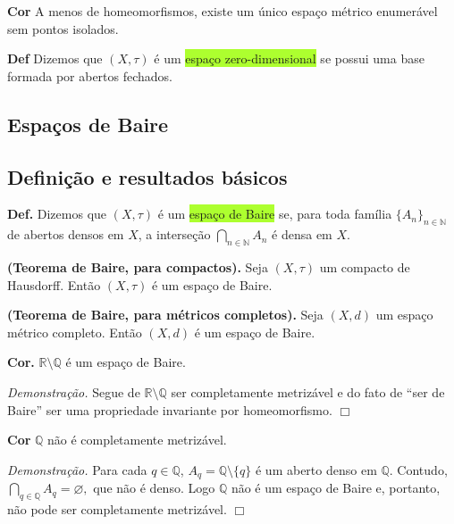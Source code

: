 \documentclass{article}
\begin{document}
\begin{landscape}
\begin{multicols}{3}
\medskip

\textbf{Cor} A menos de homeomorfismos, existe um único espaço métrico enumerável sem pontos isolados.

\medskip

\textbf{Def} Dizemos que \((X,\tau)\) é um \colorbox{GreenYellow}{espaço zero-dimensional} se possui uma base formada por abertos fechados.

\medskip
\end{multicols}
\begin{center}
    
\section{Espaços de Baire}
\end{center}
\begin{multicols}{3}
    
\subsection{Definição e resultados básicos}
\textbf{Def.} Dizemos que \((X,\tau)\) é um \colorbox{GreenYellow}{espaço de Baire} se, para toda família \(\{A_n\}_{n\in\mathbb{N}}\) de abertos densos em \(X\), a interseção
$
\bigcap_{n\in\mathbb{N}}A_n
$
é densa em \(X\).

\medskip

\textbf{(Teorema de Baire, para compactos).} Seja \((X,\tau)\) um compacto de Hausdorff. Então \((X,\tau)\) é um espaço de Baire.

\medskip

\textbf{(Teorema de Baire, para métricos completos).} Seja \((X,d)\) um espaço métrico completo. Então \((X,d)\) é um espaço de Baire.

\medskip

\textbf{Cor.} \(\mathbb{R}\setminus\mathbb{Q}\) é um espaço de Baire.  

\emph{Demonstração.} Segue de \(\mathbb{R}\setminus\mathbb{Q}\) ser completamente metrizável e do fato de “ser de Baire” ser uma propriedade invariante por homeomorfismo. \(\Box\)

\medskip

\textbf{Cor} \(\mathbb{Q}\) não é completamente metrizável.  

\emph{Demonstração.} Para cada \(q\in\mathbb{Q}\), \(A_q=\mathbb{Q}\setminus\{q\}\) é um aberto denso em \(\mathbb{Q}\). Contudo,
$
\bigcap_{q\in\mathbb{Q}}A_q=\varnothing,
$
que não é denso. Logo \(\mathbb{Q}\) não é um espaço de Baire e, portanto, não pode ser completamente metrizável. \(\Box\)
\medskip


\end{multicols}
\end{landscape}
\end{document}
